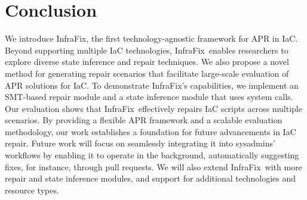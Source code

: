 \documentclass[sigconf,nonacm]{acmart}
\def\name{{\sc InfraFix}}
\begin{document}
\section{Conclusion}
We introduce \name, the first technology-agnostic framework for APR in IaC. 
Beyond supporting multiple IaC technologies, \name\ enables researchers to explore diverse state inference and repair techniques. 
We also propose a novel
method for generating repair scenarios that facilitate large-scale evaluation of APR solutions for IaC. To demonstrate \name’s capabilities, we implement an SMT-based repair module and a state inference module that uses system calls. Our evaluation shows that \name\ effectively repairs IaC scripts across multiple scenarios. By providing a flexible APR framework and a scalable evaluation methodology, our work establishes a foundation for future advancements in IaC repair. 
Future work will focus on seamlessly integrating it into sysadmins' workflows by enabling it to operate in the background, automatically suggesting fixes, for instance, through pull requests. We will also extend \name\ with more repair and state inference modules, and support for additional technologies and resource types.
\end{document}
